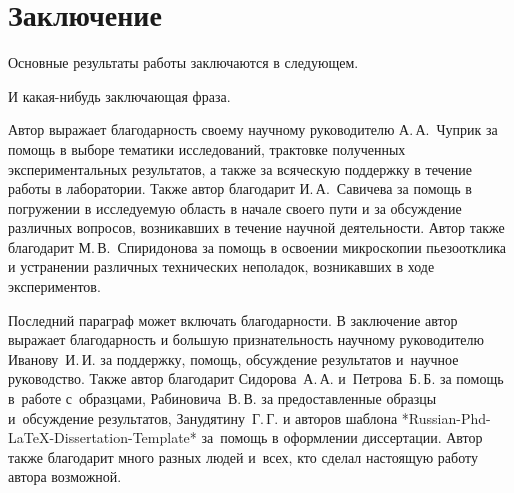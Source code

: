 \chapter*{Заключение}                       %


Основные результаты работы заключаются в следующем.

И какая-нибудь заключающая фраза.

Автор выражает благодарность своему научному руководителю А.\,А.~Чуприк за помощь в выборе тематики исследований, трактовке полученных экспериментальных результатов, а также за всяческую поддержку в течение работы в лаборатории. Также автор благодарит И.\,А.~Савичева за помощь в погружении в исследуемую область в начале своего пути и за обсуждение различных вопросов, возникавших в течение научной деятельности. Автор также благодарит М.\,В.~Спиридонова за помощь в освоении микроскопии пьезоотклика и устранении различных технических неполадок, возникавших в ходе экспериментов.

Последний параграф может включать благодарности.  В заключение автор
выражает благодарность и большую признательность научному руководителю
Иванову~И.\,И. за поддержку, помощь, обсуждение результатов и~научное
руководство. Также автор благодарит Сидорова~А.\,А. и~Петрова~Б.\,Б.
за помощь в~работе с~образцами, Рабиновича~В.\,В. за предоставленные
образцы и~обсуждение результатов, Занудятину~Г.\,Г. и авторов шаблона
*Russian-Phd-LaTeX-Dissertation-Template* за~помощь в оформлении
диссертации. Автор также благодарит много разных людей
и~всех, кто сделал настоящую работу автора возможной.
